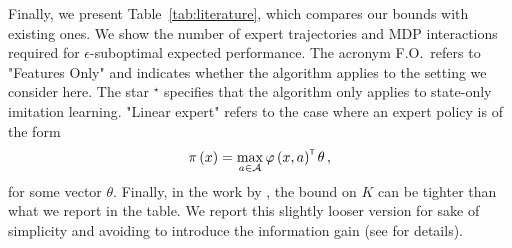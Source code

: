 Finally, we present Table~\ref{tab:literature}, which compares our bounds with existing ones.
 We show the number of expert trajectories and MDP interactions required for $\epsilon$-suboptimal expected performance. 
 The acronym F.O.\ refers to "Features Only" and indicates whether the algorithm applies to the setting we consider here. 
 The star \greentick$^\star$ specifies that the algorithm only applies to state-only imitation learning. "Linear expert" refers to the case where an expert policy is of the form
%
\begin{align*}
    \pi \left( x \right) = \max_{a \in \mathcal{A}} \varphi \left( x, a \right)^\mathsf{\scriptscriptstyle T} \theta\,,
\end{align*}
%
for some vector $\theta$. Finally, in the work by \cite{kidambi2021mobile}, the bound on $K$ can be tighter than what we report in the table. We report this slightly looser version for sake of simplicity and avoiding to introduce the information gain (see \cite{kidambi2021mobile} for details).
